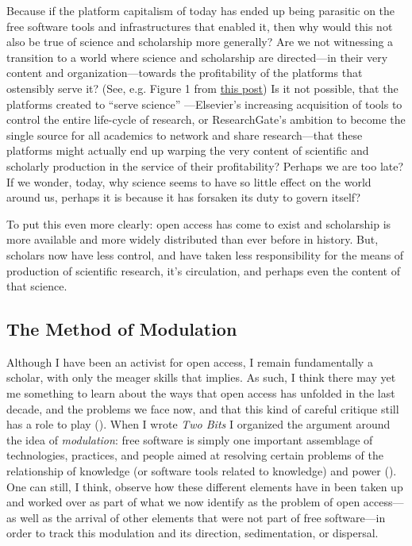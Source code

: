 \documentclass[11pt]{article}
\begin{document}
Because if the platform capitalism of today has ended up being parasitic on the free software tools and infrastructures that enabled it, then why would this not also be true of science and scholarship more generally?  Are we not witnessing a transition to a world where science and scholarship are directed---in their very content and organization---towards the profitability of the platforms that ostensibly serve it? (See, e.g. Figure 1 from \href{http://knowledgegap.org/index.php/sub-projects/rent-seeking-and-financialization-of-the-academic-publishing-industry/preliminary-findings/}{this post})  Is it not possible, that the platforms created to ``serve science'' ---Elsevier's increasing acquisition of tools to control the entire life-cycle of research, or ResearchGate's ambition to become the single source for all academics to network and share research---that these platforms might actually end up warping the very content of scientific and scholarly production in the service of their profitability?  Perhaps we are too late?  If we wonder, today, why science seems to have so little effect on the world around us, perhaps it is because it has forsaken its duty to govern itself?

To put this even more clearly: open access has come to exist and scholarship is more available and more widely distributed than ever before in history.  But, scholars now have less control, and have taken less responsibility for the means of production of scientific research, it's circulation, and perhaps even the content of that science.  

\subsection*{The Method of Modulation}
\label{sec:org2ab459a}

Although I have been an activist for open access, I remain fundamentally a scholar, with only the meager skills that implies. As such, I think there may yet me something to learn about the ways that open access has unfolded in the last decade, and the problems we face now, and that this kind of careful critique still has a role to play (\cite{foucault1997critique,folkers2015darintrut}).  When I wrote \emph{Two Bits} I organized the argument around the idea of \emph{modulation}: free software is simply one important assemblage of technologies, practices, and people aimed at resolving certain problems of the relationship of knowledge (or software tools related to knowledge) and power (\cite{hacking2004histontol,rabinow2003anthtoday}).  One can still, I think, observe how these different elements have in been taken up and worked over as part of what we now identify as the problem of open access---as well as the arrival of other elements that were not part of free software---in order to track this modulation and its direction, sedimentation, or dispersal.
\end{document}
